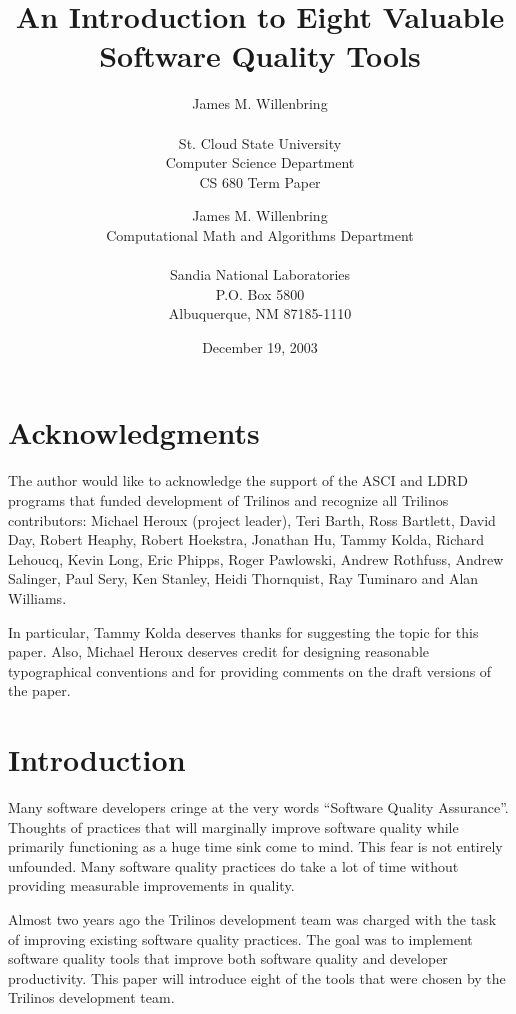 \documentclass[12pt,relax]{article}
\title{An Introduction to Eight Valuable Software Quality Tools}
\author{
James M. Willenbring \\
 \\
St. Cloud State University\\
Computer Science Department\\
CS 680 Term Paper
}
\date{December 19, 2003} %
\author{
James M. Willenbring \\
Computational Math and Algorithms Department \\
 \\
Sandia National Laboratories \\
P.O. Box 5800 \\
Albuquerque, NM 87185-1110}
\begin{document}
\maketitle



\clearpage

\section*{Acknowledgments}

The author would like to acknowledge the support of the ASCI and LDRD 
programs that funded development of Trilinos and recognize all Trilinos 
contributors: Michael Heroux (project leader), Teri Barth, Ross Bartlett, 
David Day, Robert Heaphy, Robert Hoekstra, 
Jonathan Hu, Tammy Kolda, Richard Lehoucq, Kevin Long, Eric Phipps, 
Roger Pawlowski, Andrew Rothfuss, Andrew Salinger, Paul Sery, Ken
Stanley, Heidi Thornquist, Ray Tuminaro and Alan Williams.

In particular, Tammy Kolda deserves thanks for suggesting the topic for
this paper.  Also, Michael Heroux deserves credit for designing 
reasonable typographical conventions and for providing comments on the draft
versions of the paper.

\clearpage
\tableofcontents
\listoftables

\clearpage
%

\section{Introduction}
\label{Section:Introduction}

Many software developers cringe at the very words ``Software Quality 
Assurance''.  Thoughts of practices that will marginally improve software 
quality while primarily functioning as a huge time sink come to mind.  This 
fear is not entirely unfounded.  Many software quality practices do take a lot 
of time without providing measurable improvements in quality.

Almost two years ago the Trilinos development team was charged with the task 
of improving existing software quality practices.  The goal was to implement 
software quality tools that improve both software quality and developer 
productivity.  This paper will introduce eight of the tools that were 
chosen by the Trilinos development team.
\end{document}
